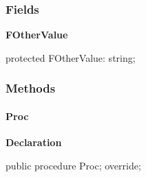 \documentclass{report}
\newif\ifpdf
\begin{document}
\subsubsection*{\large{\textbf{Fields}}\normalsize\hspace{1ex}\hfill}
\begin{list}{}{
\setlength{\itemindent}{0cm}
\setlength{\listparindent}{0cm}
\setlength{\leftmargin}{\evensidemargin}
\addtolength{\leftmargin}{\tmplength}
\settowidth{\labelsep}{X}
\addtolength{\leftmargin}{\labelsep}
\setlength{\labelwidth}{\tmplength}
}
\label{ok_inherited_descriptions.TClassC-FOtherValue}
\item[\textbf{FOtherValue}\hfill]
\ifpdf
\begin{flushleft}
\fi
\begin{ttfamily}
protected FOtherValue: string;\end{ttfamily}

\ifpdf
\end{flushleft}
\fi


\par  \end{list}
\subsubsection*{\large{\textbf{Methods}}\normalsize\hspace{1ex}\hfill}
\paragraph*{Proc}\hspace*{\fill}

\label{ok_inherited_descriptions.TClassC-Proc}
\begin{list}{}{
\setlength{\itemindent}{0cm}
\setlength{\listparindent}{0cm}
\setlength{\leftmargin}{\evensidemargin}
\addtolength{\leftmargin}{\tmplength}
\settowidth{\labelsep}{X}
\addtolength{\leftmargin}{\labelsep}
\setlength{\labelwidth}{\tmplength}
}
\item[\textbf{Declaration}\hfill]
\ifpdf
\begin{flushleft}
\fi
\begin{ttfamily}
public procedure Proc; override;\end{ttfamily}

\ifpdf
\end{flushleft}
\fi

\end{list}
\end{document}
